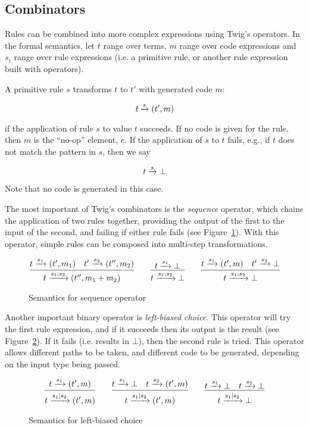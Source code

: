 \subsection{Combinators}

Rules can be combined into more complex expressions using Twig's operators. In the formal semantics, let $t$ range over terms, $m$ range over code expressions and $s_i$ range over rule expressions (i.e. a primitive rule, or another rule expression built with operators).

A primitive rule $s$ transforms $t$ to $t'$ with generated code $m$:

\[
t \xrightarrow{s} (t',m)
\]

if the application of rule $s$ to value $t$ succeeds. If no code is given for the rule, then $m$ is the ``no-op'' element, $e$. If the application of $s$ to $t$ fails, e.g., if $t$ does not match the pattern in $s$, then we say

\[
t \xrightarrow{s} \bot
\]

Note that no code is generated in this case.

The most important of Twig's combinators is the \emph{sequence} operator, which chains the application of two rules together, providing the output of the first to the input of the second, and failing if either rule fails (see Figure~\ref{fig:seq}). With this operator, simple rules can be composed into multi-step transformations.

\begin{figure}[ht]
\label{fig:seq}
\[
\infer
  {t \arr{s_1;s_2} (t'',m_1+m_2)}
  {t \arr{s_1} (t',m_1) \quad t' \arr{s_2} (t'',m_2)}
\qquad
\infer
  {t \arr{s_1;s_2} \bot}
  {t \arr{s_1} \bot}
\qquad
\infer
  {t \arr{s_1;s_2} \bot}
  {t \arr{s_1} (t',m) \quad t' \arr{s_2} \bot}
\]
\caption{Semantics for sequence operator}
\end{figure}

Another important binary operator is \emph{left-biased choice}. This operator will try the first rule expression, and if it succeeds then its output is the result (see Figure~\ref{fig:choice}). If it fails (i.e. results in $\bot$), then the second rule is tried. This operator allows different paths to be taken, and different code to be generated, depending on the input type being passed.

\begin{figure}[ht]
\label{fig:choice}
\[
\infer
  {t \arr{s_1|s_2} (t',m)}
  {t \arr{s_1} (t',m)}
\qquad 
\infer
  {t \arr{s_1|s_2} (t',m)}
  {t \arr{s_1} \bot \quad t \arr{s_2} (t',m)}
\qquad
\infer
  {t \arr{s_1|s_2} \bot}
  {t \arr{s_1} \bot \quad t \arr{s_2} \bot}
\]
\caption{Semantics for left-biased choice}
\end{figure}

